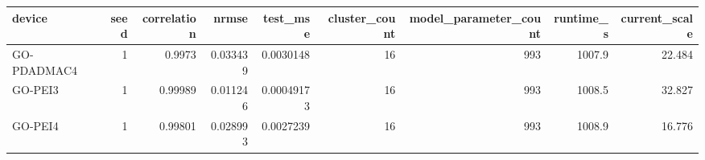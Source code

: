 \begin{tabular}{lrrrrrrrr}
\toprule
device & seed & correlation & nrmse & test\_mse & cluster\_count & model\_parameter\_count & runtime\_s & current\_scale \\
\midrule
GO-PDADMAC4 & 1 & 0.9973 & 0.033439 & 0.0030148 & 16 & 993 & 1007.9 & 22.484 \\
GO-PEI3 & 1 & 0.99989 & 0.011246 & 0.00049173 & 16 & 993 & 1008.5 & 32.827 \\
GO-PEI4 & 1 & 0.99801 & 0.028993 & 0.0027239 & 16 & 993 & 1008.9 & 16.776 \\
\bottomrule
\end{tabular}

